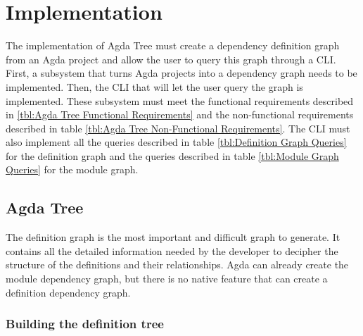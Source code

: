 
\chapter{Implementation} \label{ch:implementation}

The implementation of Agda Tree must create a dependency definition graph from
an Agda project and allow the user to query this graph through a CLI. First, a
subsystem that turns Agda projects into a dependency graph needs to be
implemented. Then, the CLI that will let the user query the graph is
implemented. These subsystem must meet the functional requirements described in
\ref{tbl:Agda Tree Functional Requirements} and the non-functional requirements
described in table \ref{tbl:Agda Tree Non-Functional Requirements}. The CLI
must also implement all the queries described in table \ref{tbl:Definition Graph Queries} 
for the definition graph and the queries described in table
\ref{tbl:Module Graph Queries} for the module graph.



\section{Agda Tree}

The definition graph is the most important and difficult graph to generate. It
contains all the detailed information needed by the developer to decipher the
structure of the definitions and their relationships. Agda can already create
the module dependency graph, but there is no native feature that can create a
definition dependency graph. 

\subsection{Building the definition tree}


